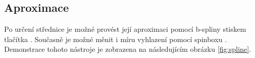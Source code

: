 \subsection{Aproximace}
Po určení střednice je možné provést její aproximaci pomocí b-spliny stiskem tlačítka . Současně je možné měnit i míru vyhlazení pomocí spinboxu . Demonstrace tohoto nástroje je zobrazena na následujícím obrázku \ref{fig:spline}.

\begin{figure}[htb]
	\centering
	\hskip 0.1cm
	\\

\end{figure}
